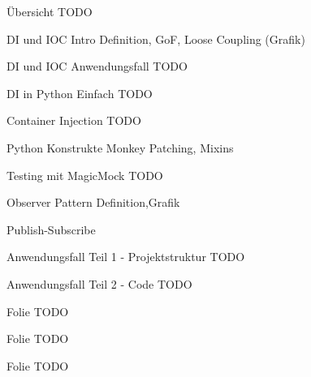 \begin{frame}{Übersicht}
    TODO
\end{frame}

\begin{frame}{DI und IOC Intro}
  Definition, GoF, Loose Coupling (Grafik)
\end{frame}

\begin{frame}{DI und IOC Anwendungsfall}
   TODO
 \end{frame}
 
\begin{frame}{DI in Python Einfach}
TODO
  \end{frame}

\begin{frame}{Container Injection}
TODO
  \end{frame}

\begin{frame}{Python Konstrukte}
    Monkey Patching, Mixins
\end{frame}

\begin{frame}{Testing mit MagicMock}
    TODO
\end{frame}

\begin{frame}{Observer Pattern}
    Definition,Grafik
\end{frame}

\begin{frame}{Publish-Subscribe}
\end{frame}

\begin{frame}{Anwendungsfall Teil 1 - Projektstruktur}
    TODO
\end{frame}

\begin{frame}{Anwendungsfall Teil 2 - Code}
    TODO
\end{frame}

\begin{frame}{Folie}
    TODO
\end{frame}

\begin{frame}{Folie}
    TODO
\end{frame}

\begin{frame}{Folie}
    TODO
\end{frame}

